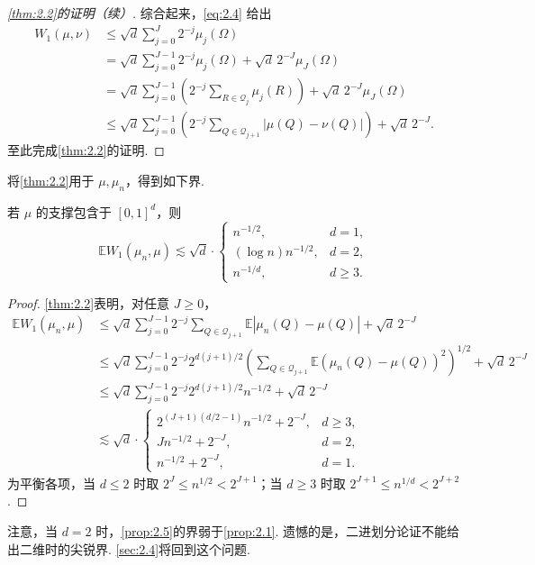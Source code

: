 \begin{proof}[\autoref{thm:2.2}的证明（续）]
综合起来，\eqref{eq:2.4} 给出
$$\begin{aligned}
W_1(\mu,\nu)&\le\sqrt d\sum_{j=0}^J2^{-j}\mu_j(\Omega)\\
&=\sqrt d\sum_{j=0}^{J-1}2^{-j}\mu_j(\Omega)+\sqrt d\,2^{-J}\mu_J(\Omega)\\
&=\sqrt d\sum_{j=0}^{J-1}\left(2^{-j}\sum_{R\in\mathcal Q_j}\mu_j(R)\right)+\sqrt d\,2^{-J}\mu_J(\Omega)\\
&\le\sqrt d\sum_{j=0}^{J-1}\left(2^{-j}\sum_{Q\in\mathcal Q_{j+1}}|\mu(Q)-\nu(Q)|\right)+\sqrt d\,2^{-J}.
\end{aligned}$$
至此完成\autoref{thm:2.2}的证明.
\end{proof}
将\autoref{thm:2.2}用于 $\mu,\mu_n$，得到如下界.
\begin{proposition}\label{prop:2.5}
若 $\mu$ 的支撑包含于 $[0,1]^d$，则
$$\mathbb E W_1(\mu_n,\mu)\lesssim\sqrt d\cdot\begin{cases}
n^{-1/2},&d=1,\\
(\log n)n^{-1/2},&d=2,\\
n^{-1/d},&d\ge3.
\end{cases}$$
\end{proposition}
\begin{proof}
\autoref{thm:2.2}表明，对任意 $J\ge0$，
$$\begin{aligned}
\mathbb E W_1(\mu_n,\mu)
&\le\sqrt d\sum_{j=0}^{J-1}2^{-j}\sum_{Q\in\mathcal Q_{j+1}}\mathbb E|\mu_n(Q)-\mu(Q)|+\sqrt d\,2^{-J}\\
&\le\sqrt d\sum_{j=0}^{J-1}2^{-j}2^{d(j+1)/2}\left(\sum_{Q\in\mathcal Q_{j+1}}\mathbb E(\mu_n(Q)-\mu(Q))^2\right)^{1/2}+\sqrt d\,2^{-J}\\
&\le\sqrt d\sum_{j=0}^{J-1}2^{-j}2^{d(j+1)/2}n^{-1/2}+\sqrt d\,2^{-J}\\
&\lesssim\sqrt d\cdot\begin{cases}
2^{(J+1)(d/2-1)}n^{-1/2}+2^{-J},&d\ge3,\\
Jn^{-1/2}+2^{-J},&d=2,\\
n^{-1/2}+2^{-J},&d=1.
\end{cases}
\end{aligned}$$
为平衡各项，当 $d\le2$ 时取 $2^J\le n^{1/2}<2^{J+1}$；当 $d\ge3$ 时取 $2^{J+1}\le n^{1/d}<2^{J+2}$.
\end{proof}
注意，当 $d=2$ 时，\autoref{prop:2.5}的界弱于\autoref{prop:2.1}. 遗憾的是，二进划分论证不能给出二维时的尖锐界. \autoref{sec:2.4}将回到这个问题.

